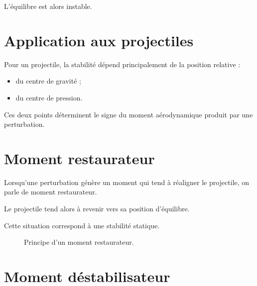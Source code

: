 L'équilibre est alors instable.

\section{Application aux projectiles}

Pour un projectile, la stabilité dépend principalement de la position
relative :

\begin{itemize}
    \item du centre de gravité ;
    \item du centre de pression.
\end{itemize}

Ces deux points déterminent le signe du moment aérodynamique produit par une
perturbation.

\section{Moment restaurateur}

Lorsqu'une perturbation génère un moment qui tend à réaligner le projectile,
on parle de moment restaurateur.

Le projectile tend alors à revenir vers sa position d'équilibre.

Cette situation correspond à une stabilité statique.

\begin{figure}[htbp]
\centering
{}
\caption{Principe d'un moment restaurateur.}
\label{fig:moment_restaurateur}
\end{figure}

\section{Moment déstabilisateur}

